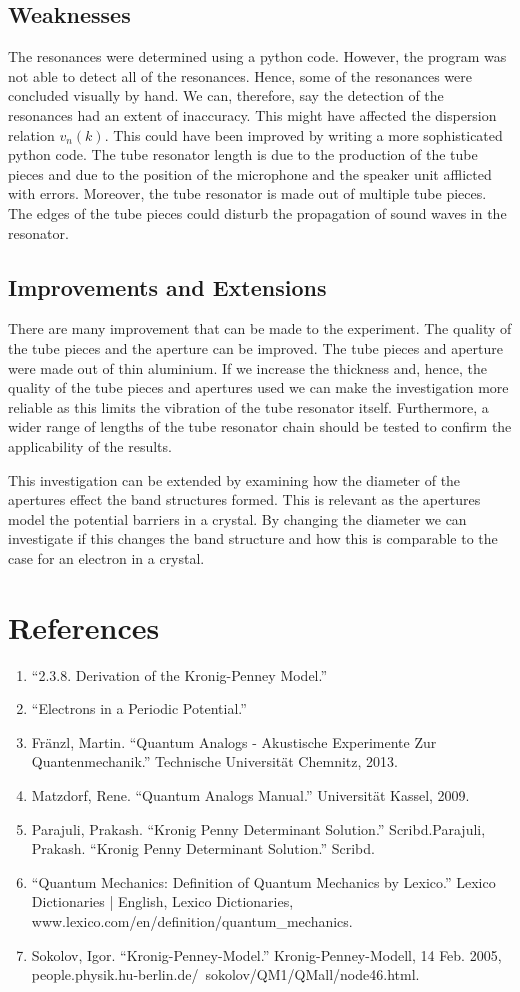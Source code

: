 \documentclass[12pt]{article}
\begin{document}
\subsection{Weaknesses}
The resonances were determined using a python code. However, the program was not able to detect all of the resonances. Hence, some of the resonances were concluded visually by hand. We can, therefore, say the detection of the resonances had an extent of inaccuracy. This might have affected the dispersion relation $v_n(k)$. This could have been improved by writing a more sophisticated python code.
The tube resonator length is due to the production of the tube pieces and due to the position of the microphone and the speaker unit afflicted with errors. Moreover, the tube resonator is made out of multiple tube pieces. The edges of the tube pieces could disturb the propagation of sound waves in the resonator. 
\subsection{Improvements and Extensions}
There are many improvement that can be made to the experiment. The quality of the tube pieces and the aperture can be improved. The tube pieces and aperture were made out of thin aluminium. If we increase the thickness and, hence, the quality of the tube pieces and apertures used we can make the investigation more reliable as this limits the vibration of the tube resonator itself. Furthermore, a wider range of lengths of the tube resonator chain should be tested to confirm the applicability of the results.

This investigation can be extended by examining how the diameter of the apertures effect the band structures formed. This is relevant as the apertures model the potential barriers in a crystal. By changing the diameter we can investigate if this changes the band structure and how this is comparable to the case for an electron in a crystal.
\section{References}
\begin{enumerate}
	\item “2.3.8. Derivation of the Kronig-Penney Model.”
	\item “Electrons in a Periodic Potential.”
	\item Fränzl, Martin. “Quantum Analogs - Akustische Experimente Zur Quantenmechanik.” Technische Universität Chemnitz, 2013.
	\item Matzdorf, Rene. “Quantum Analogs Manual.” Universität Kassel, 2009.
	\item Parajuli, Prakash. “Kronig Penny Determinant Solution.” Scribd.Parajuli, Prakash. “Kronig Penny Determinant Solution.” Scribd.
	\item “Quantum Mechanics: Definition of Quantum Mechanics by Lexico.” Lexico Dictionaries | English, Lexico Dictionaries, www.lexico.com/en/definition/quantum\_mechanics.
	\item Sokolov, Igor. “Kronig-Penney-Model.” Kronig-Penney-Modell, 14 Feb. 2005, people.physik.hu-berlin.de/~sokolov/QM1/QMall/node46.html.
\end{enumerate}
\clearpage
\end{document}
